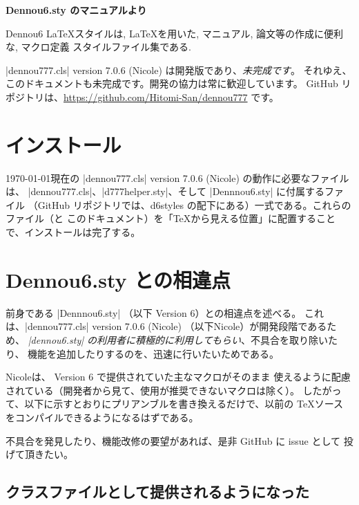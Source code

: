 \documentclass[report,notitlepage]{dennou777}
\newcommand{\vseven}{Nicole}\newcommand{\dversion}{version 7.0.6 }
\begin{document}
\maketitle
\thispagestyle{DAheadings}

{\noindent\hfill\bfseries\sffamily Dennou6.sty のマニュアルより\hfill}

{\small Dennou6 \LaTeX スタイルは, \LaTeX を用いた, マニュアル, 論文等の作成に便利な,
マクロ定義 スタイルファイル集である.} %

\noindent\hrulefill

|dennou777.cls| \dversion (\vseven) は開発版であり、\emph{未完成です}。
それゆえ、このドキュメントも未完成です。開発の協力は常に歓迎しています。
GitHub リポジトリは、\url{https://github.com/Hitomi-San/dennou777} です。

\tableofcontents
\pagebreak

\chapter{インストール}

\today 現在の |dennou777.cls| \dversion (\vseven) の動作に必要なファイルは、
|dennou777.cls|、|d777helper.sty|、そして |Dennnou6.sty| に付属するファイル
（GitHub リポジトリでは、d6styles の配下にある）一式である。これらのファイル（と
このドキュメント）を「\TeX から見える位置」に配置することで、インストールは完了する。

\chapter{Dennou6.sty との相違点}

前身である |Dennnou6.sty| （以下 Version 6）との相違点を述べる。
これは、|dennou777.cls| \dversion (\vseven) （以下\vseven）が開発段階であるため、
\emph{|dennou6.sty| の利用者に積極的に利用してもらい}、不具合を取り除いたり、
機能を追加したりするのを、迅速に行いたいためである。

\vseven は、 Version 6 で提供されていた主なマクロがそのまま
使えるように配慮されている（開発者から見て、使用が推奨できないマクロは除く）。
したがって、以下に示すとおりにプリアンブルを書き換えるだけで、以前の \TeX ソース
をコンパイルできるようになるはずである。

不具合を発見したり、機能改修の要望があれば、是非 GitHub に issue として
投げて頂きたい。

\section{クラスファイルとして提供されるようになった}
\end{document}
